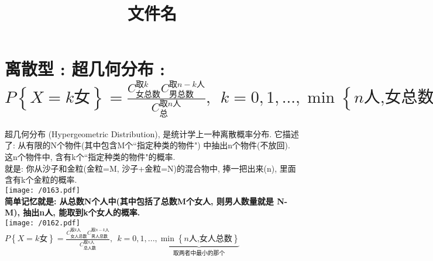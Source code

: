 \documentclass[UTF8]{ctexart}
\title{文件名}
\begin{document}
	\tableofcontents %
	\date{} %
	\maketitle  %
	
	
	
	\section{离散型 : 超几何分布 :$ 
			P\left\{ X=k\text{女} \right\} =\frac{C_{\text{女总数}}^{\text{取}k}C_{\text{男总数}}^{\text{取}n-k\text{人}}}{C_{\text{总}}^{\text{取}n\text{人}}},\ \ k=0,1,...,\min \left\{ n\text{人,女总数} \right\} 
			$}
	
	超几何分布  (Hypergeometric Distribution), 是统计学上一种离散概率分布. 它描述了: 从有限的N个物件(其中包含M个``指定种类的物件") 中抽出n个物件(不放回). 这n个物件中, 含有k个``指定种类的物件"的概率. \\	
	
	就是: 你从沙子和金粒(金粒=M, 沙子+金粒=N)的混合物中, 捧一把出来(n), 里面含有k个金粒的概率. \\
	
	\texttt{[image: /0163.pdf]} \\
	
	\textbf{简单记忆就是: 从总数N个人中(其中包括了总数M个女人, 则男人数量就是 N-M), 抽出n人, 能取到k个女人的概率.} \\
	
	\texttt{[image: /0162.pdf]} \\
	
	$\boxed{
	P\left\{ X=k\text{女} \right\} =\frac{C_{\text{女人总数}}^{\text{取}k\text{人}}C_{\text{男人总数}}^{\text{取}n-k\text{人}}}{C_{\text{总人数}}^{\text{取}n\text{人}}},\ \ k=0,1,...,\underset{\text{取两者中最小的那个}}{\underbrace{\min \left\{ n\text{人,女人总数} \right\} }}
	}$ \\
	\vspace{1em} 
	
\end{document}
